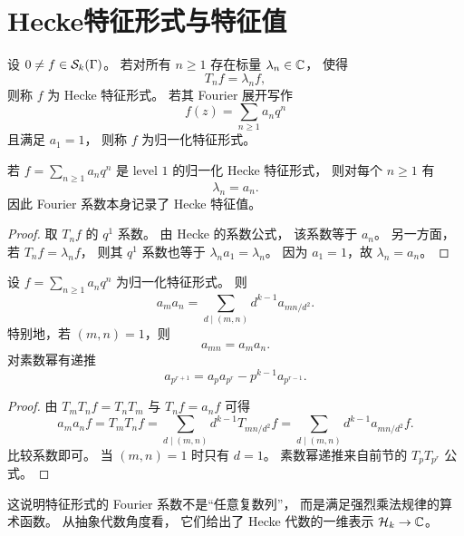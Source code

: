 \section{Hecke特征形式与特征值}
\begin{definition}
设 $0\ne f\in \mathcal{S}_k(\Gamma)$。
若对所有 $n\ge 1$ 存在标量 $\lambda_n\in\mathbb{C}$，
使得
\[ T_n f=\lambda_n f, \]
则称 $f$ 为 Hecke 特征形式。
若其 Fourier 展开写作
\[ f(z)=\sum_{n\ge 1} a_n q^n \]
且满足 $a_1=1$，
则称 $f$ 为归一化特征形式。
\end{definition}
\begin{proposition}
若 $f=\sum_{n\ge 1}a_nq^n$ 是 level $1$ 的归一化 Hecke 特征形式，
则对每个 $n\ge 1$ 有
\[ \lambda_n=a_n. \]
因此 Fourier 系数本身记录了 Hecke 特征值。
\end{proposition}
\begin{proof}
取 $T_nf$ 的 $q^1$ 系数。
由 Hecke 的系数公式，
该系数等于 $a_n$。
另一方面，
若 $T_nf=\lambda_nf$，
则其 $q^1$ 系数也等于 $\lambda_n a_1=\lambda_n$。
因为 $a_1=1$，故 $\lambda_n=a_n$。
\end{proof}
\begin{theorem}
设 $f=\sum_{n\ge 1}a_nq^n$ 为归一化特征形式。
则
\[ a_ma_n=\sum_{d\mid(m,n)} d^{k-1}a_{mn/d^2}. \]
特别地，若 $(m,n)=1$，则
\[ a_{mn}=a_ma_n. \]
对素数幂有递推
\[ a_{p^{r+1}}=a_pa_{p^r}-p^{k-1}a_{p^{r-1}}. \]
\end{theorem}
\begin{proof}
由 $T_mT_nf=T_nT_m$ 与 $T_nf=a_nf$ 可得
\[ a_ma_n f=T_mT_nf =\sum_{d\mid(m,n)} d^{k-1}T_{mn/d^2}f =\sum_{d\mid(m,n)} d^{k-1}a_{mn/d^2}f. \]
比较系数即可。
当 $(m,n)=1$ 时只有 $d=1$。
素数幂递推来自前节的 $T_pT_{p^r}$ 公式。
\end{proof}
这说明特征形式的 Fourier 系数不是“任意复数列”， 而是满足强烈乘法规律的算术函数。 从抽象代数角度看， 它们给出了 Hecke 代数的一维表示 $\mathcal{H}_k\to\mathbb{C}$。
